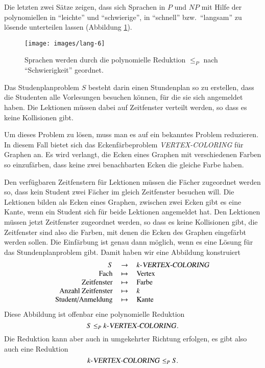 Die letzten zwei Sätze zeigen, dass sich Sprachen in $P$ und $NP$
mit Hilfe der polynomiellen in ``leichte'' und ``schwierige'',
in ``schnell'' bzw.~``langsam'' zu lösende unterteilen lassen
(Abbildung \ref{pnporder}).
\begin{figure}
\begin{center}
\texttt{[image: images/lang-6]}
\end{center}
\caption{Sprachen werden durch die polynomielle Reduktion $\le_P$
nach ``Schwierigkeit'' geordnet.\label{pnporder}}
\end{figure}%

\begin{beispiel}
Das Studenplanproblem $S$ besteht darin
einen Stundenplan so zu erstellen, dass die Studenten alle
Vorlesungen besuchen können, für die sie sich angemeldet haben.
Die Lektionen müssen dabei auf Zeitfenster verteilt werden,
so dass es keine Kollisionen gibt.

Um dieses Problem zu lösen, muss man es auf ein bekanntes
Problem reduzieren. In diesem Fall bietet sich das Eckenfärbeproblem
\textsl{VERTEX-COLORING}
für Graphen an. Es wird verlangt, die Ecken eines Graphen mit 
verschiedenen Farben so einzufärben, dass keine zwei benachbarten
Ecken die gleiche Farbe haben.

Den verfügbaren Zeitfenstern für Lektionen müssen die Fächer zugeordnet werden
so, dass kein Student zwei Fächer im gleich Zeitfenster
besuchen will.
Die Lektionen bilden als Ecken eines Graphen, zwischen zwei
Ecken gibt es eine Kante, wenn ein Student sich für beide 
Lektionen angemeldet hat. Den Lektionen müssen jetzt Zeitfenster
zugeordnet werden, so dass es keine Kollisionen gibt, die
Zeitfenster sind also die Farben, mit denen die Ecken  des
Graphen eingefärbt werden sollen. Die Einfärbung ist genau
dann möglich, wenn es eine Lösung für das Stundenplanproblem gibt.
Damit haben wir eine Abbildung konstruiert
\[
\begin{tabular}{>{$}r<{$}>{$}c<{$}>{$}l<{$}}
S&\to&\text{$k$-\textsl{VERTEX-COLORING}}\\
\text{Fach}&\mapsto&\text{Vertex}\\
\text{Zeitfenster}&\mapsto&\text{Farbe}\\
\text{Anzahl Zeitfenster}&\mapsto&k\\
\text{Student/Anmeldung}&\mapsto&\text{Kante}
\end{tabular}
\]
Diese Abbildung ist offenbar eine polynomielle Reduktion
\[
S\le_P \text{$k$-\textsl{VERTEX-COLORING}}.
\]
Die Reduktion kann aber auch in umgekehrter Richtung erfolgen,
es gibt also auch eine Reduktion
\[
\text{$k$-\textsl{VERTEX-COLORING}}\le_P S.
\]
\end{beispiel}

